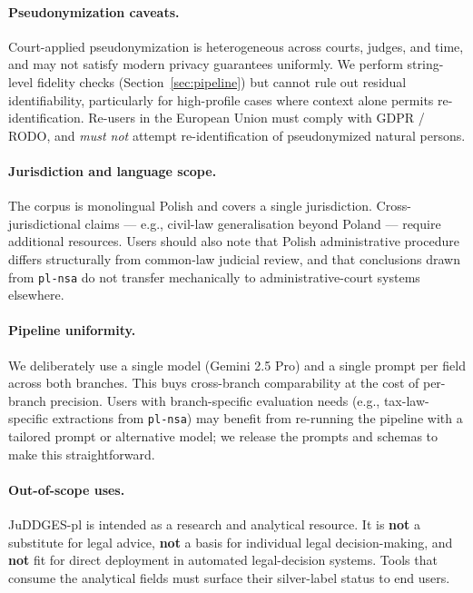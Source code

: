 \documentclass{article}
\begin{document}
\paragraph{Pseudonymization caveats.} Court-applied pseudonymization is heterogeneous across courts, judges, and time, and may not satisfy modern privacy guarantees uniformly. We perform string-level fidelity checks (Section~\ref{sec:pipeline}) but cannot rule out residual identifiability, particularly for high-profile cases where context alone permits re-identification. Re-users in the European Union must comply with GDPR / RODO, and \emph{must not} attempt re-identification of pseudonymized natural persons.

\paragraph{Jurisdiction and language scope.} The corpus is monolingual Polish and covers a single jurisdiction. Cross-jurisdictional claims --- e.g., civil-law generalisation beyond Poland --- require additional resources. Users should also note that Polish administrative procedure differs structurally from common-law judicial review, and that conclusions drawn from \texttt{pl-nsa} do not transfer mechanically to administrative-court systems elsewhere.

\paragraph{Pipeline uniformity.} We deliberately use a single model (Gemini 2.5 Pro) and a single prompt per field across both branches. This buys cross-branch comparability at the cost of per-branch precision. Users with branch-specific evaluation needs (e.g., tax-law-specific extractions from \texttt{pl-nsa}) may benefit from re-running the pipeline with a tailored prompt or alternative model; we release the prompts and schemas to make this straightforward.

\paragraph{Out-of-scope uses.} JuDDGES-pl is intended as a research and analytical resource. It is \textbf{not} a substitute for legal advice, \textbf{not} a basis for individual legal decision-making, and \textbf{not} fit for direct deployment in automated legal-decision systems. Tools that consume the analytical fields must surface their silver-label status to end users.
\end{document}
